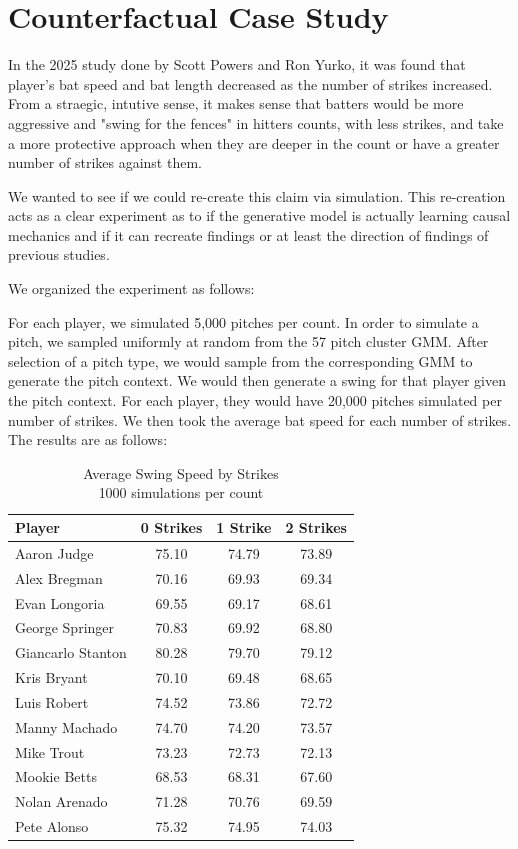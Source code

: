 \documentclass[11pt]{article}
\begin{document}
\section{Counterfactual Case Study}

In the 2025 study done by Scott Powers and Ron Yurko, it was found that player's bat speed and bat length decreased as the number of strikes increased. From a straegic, intutive sense, it makes sense that batters would be more aggressive and "swing for the fences" in hitters counts, with less strikes, and take a more protective approach when they are deeper in the count or have a greater number of strikes against them.

We wanted to see if we could re-create this claim via simulation. This re-creation acts as a clear experiment as to if the generative model is actually learning causal mechanics and if it can recreate findings or at least the direction of findings of previous studies.

We organized the experiment as follows:

For each player, we simulated 5,000 pitches per count. In order to simulate a pitch, we sampled uniformly at random from the 57 pitch cluster GMM. After selection of a pitch type, we would sample from the corresponding GMM to generate the pitch context. We would then generate a swing for that player given the pitch context. For each player, they would have 20,000 pitches simulated per number of strikes. We then took the average bat speed for each number of strikes. The results are as follows:

\begin{table}[H]
\centering
\caption{Average Swing Speed by Strikes \\ \small{1000 simulations per count}}
\label{tab:avg_swing_speed_by_strikes}
\begin{tabular}{lccc}
\hline
\textbf{Player} & \textbf{0 Strikes} & \textbf{1 Strike} & \textbf{2 Strikes} \\
\hline
Aaron Judge      & 75.10 & 74.79 & 73.89 \\
Alex Bregman     & 70.16 & 69.93 & 69.34 \\
Evan Longoria    & 69.55 & 69.17 & 68.61 \\
George Springer  & 70.83 & 69.92 & 68.80 \\
Giancarlo Stanton& 80.28 & 79.70 & 79.12 \\
Kris Bryant      & 70.10 & 69.48 & 68.65 \\
Luis Robert      & 74.52 & 73.86 & 72.72 \\
Manny Machado    & 74.70 & 74.20 & 73.57 \\
Mike Trout       & 73.23 & 72.73 & 72.13 \\
Mookie Betts     & 68.53 & 68.31 & 67.60 \\
Nolan Arenado    & 71.28 & 70.76 & 69.59 \\
Pete Alonso      & 75.32 & 74.95 & 74.03 \\
\hline
\end{tabular}
\end{table}
\end{document}
